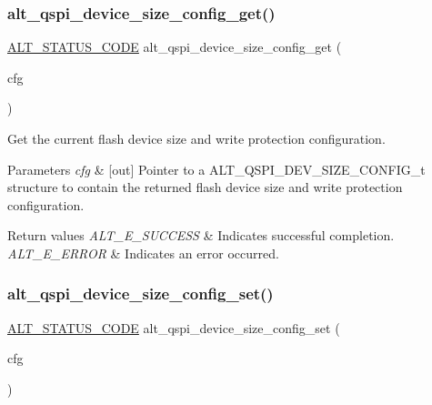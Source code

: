 \subsubsection{\texorpdfstring{alt\_qspi\_device\_size\_config\_get()}{alt\_qspi\_device\_size\_config\_get()}}
{\footnotesize\ttfamily \mbox{\hyperlink{hwlib_8h_abdb0d369f069723ca55d6c94bcaaaa12}{A\+L\+T\+\_\+\+S\+T\+A\+T\+U\+S\+\_\+\+C\+O\+DE}} alt\+\_\+qspi\+\_\+device\+\_\+size\+\_\+config\+\_\+get (\begin{DoxyParamCaption}\item[{\mbox{\hyperlink{group__ALT__QSPI__DEV__CFG_gaeeacf956659047dac90f9dde87817817}{A\+L\+T\+\_\+\+Q\+S\+P\+I\+\_\+\+D\+E\+V\+\_\+\+S\+I\+Z\+E\+\_\+\+C\+O\+N\+F\+I\+G\+\_\+t}} $\ast$}]{cfg }\end{DoxyParamCaption})}

Get the current flash device size and write protection configuration.


\begin{DoxyParams}{Parameters}
{\em cfg} & \mbox{[}out\mbox{]} Pointer to a A\+L\+T\+\_\+\+Q\+S\+P\+I\+\_\+\+D\+E\+V\+\_\+\+S\+I\+Z\+E\+\_\+\+C\+O\+N\+F\+I\+G\+\_\+t structure to contain the returned flash device size and write protection configuration.\\
\hline
\end{DoxyParams}

\begin{DoxyRetVals}{Return values}
{\em A\+L\+T\+\_\+\+E\+\_\+\+S\+U\+C\+C\+E\+SS} & Indicates successful completion. \\
\hline
{\em A\+L\+T\+\_\+\+E\+\_\+\+E\+R\+R\+OR} & Indicates an error occurred. \\
\hline
\end{DoxyRetVals}
\mbox{\label{group__ALT__QSPI__DEV__CFG_ga80c5f6f70f44a4ddf9f4766b0f643b10}} 
\subsubsection{\texorpdfstring{alt\_qspi\_device\_size\_config\_set()}{alt\_qspi\_device\_size\_config\_set()}}
{\footnotesize\ttfamily \mbox{\hyperlink{hwlib_8h_abdb0d369f069723ca55d6c94bcaaaa12}{A\+L\+T\+\_\+\+S\+T\+A\+T\+U\+S\+\_\+\+C\+O\+DE}} alt\+\_\+qspi\+\_\+device\+\_\+size\+\_\+config\+\_\+set (\begin{DoxyParamCaption}\item[{const \mbox{\hyperlink{group__ALT__QSPI__DEV__CFG_gaeeacf956659047dac90f9dde87817817}{A\+L\+T\+\_\+\+Q\+S\+P\+I\+\_\+\+D\+E\+V\+\_\+\+S\+I\+Z\+E\+\_\+\+C\+O\+N\+F\+I\+G\+\_\+t}} $\ast$}]{cfg }\end{DoxyParamCaption})}

